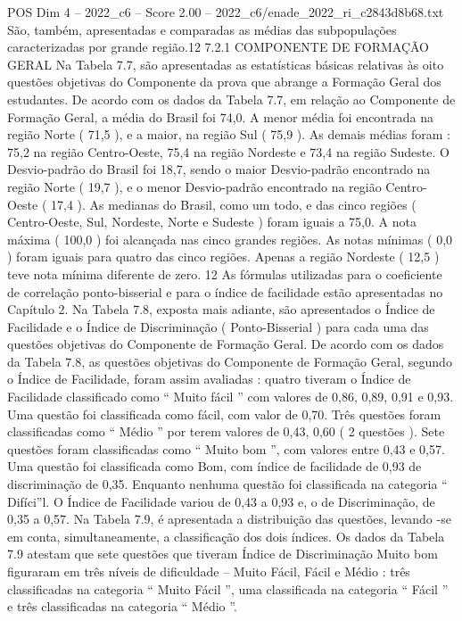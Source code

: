 \begin{textsample}{POS Dim 4 – 2022\_c6 – Score 2.00 – 2022\_c6/enade\_2022\_ri\_c2843d8b68.txt}
São, também, apresentadas e comparadas as médias das subpopulações caracterizadas por grande região.12 7.2.1 COMPONENTE DE FORMAÇÃO GERAL Na Tabela 7.7, são apresentadas as estatísticas básicas relativas às oito questões objetivas do Componente da prova que abrange a Formação Geral dos estudantes.
De acordo com os dados da Tabela 7.7, em relação ao Componente de Formação Geral, a média do Brasil foi 74,0.
A menor média foi encontrada na região Norte ( 71,5 ), e a maior, na região Sul ( 75,9 ).
As demais médias foram : 75,2 na região Centro-Oeste, 75,4 na região Nordeste e 73,4 na região Sudeste.
O Desvio-padrão do Brasil foi 18,7, sendo o maior Desvio-padrão encontrado na região Norte ( 19,7 ), e o menor Desvio-padrão encontrado na região Centro-Oeste ( 17,4 ).
As medianas do Brasil, como um todo, e das cinco regiões ( Centro-Oeste, Sul, Nordeste, Norte e Sudeste ) foram iguais a 75,0.
A nota máxima ( 100,0 ) foi alcançada nas cinco grandes regiões.
As notas mínimas ( 0,0 ) foram iguais para quatro das cinco regiões.
Apenas a região Nordeste ( 12,5 ) teve nota mínima diferente de zero. 12 As fórmulas utilizadas para o coeficiente de correlação ponto-bisserial e para o índice de facilidade estão apresentadas no Capítulo 2.
Na Tabela 7.8, exposta mais adiante, são apresentados o Índice de Facilidade e o Índice de Discriminação ( Ponto-Bisserial ) para cada uma das questões objetivas do Componente de Formação Geral.
De acordo com os dados da Tabela 7.8, as questões objetivas do Componente de Formação Geral, segundo o Índice de Facilidade, foram assim avaliadas : quatro tiveram o Índice de Facilidade classificado como “ Muito fácil ” com valores de 0,86, 0,89, 0,91 e 0,93.
Uma questão foi classificada como fácil, com valor de 0,70.
Três questões foram classificadas como “ Médio ” por terem valores de 0,43, 0,60 ( 2 questões ).
Sete questões foram classificadas como “ Muito bom ”, com valores entre 0,43 e 0,57.
Uma questão foi classificada como Bom, com índice de facilidade de 0,93 de discriminação de 0,35.
Enquanto nenhuma questão foi classificada na categoria “ Difíci”l.
O Índice de Facilidade variou de 0,43 a 0,93 e, o de Discriminação, de 0,35 a 0,57.
Na Tabela 7.9, é apresentada a distribuição das questões, levando -se em conta, simultaneamente, a classificação dos dois índices.
Os dados da Tabela 7.9 atestam que sete questões que tiveram Índice de Discriminação Muito bom figuraram em três níveis de dificuldade – Muito Fácil, Fácil e Médio : três classificadas na categoria “ Muito Fácil ”, uma classificada na categoria “ Fácil ” e três classificadas na categoria “ Médio ”.

\end{textsample}
